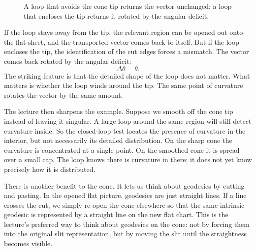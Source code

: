 \begin{figure}[h]
\centering
{}
\caption{A loop that avoids the cone tip returns the vector unchanged; a loop that encloses the tip returns it rotated by the angular deficit.}
\end{figure}

If the loop stays away from the tip, the relevant region can be opened out onto the flat sheet, and the transported vector comes back to itself. But if the loop encloses the tip, the identification of the cut edges forces a mismatch. The vector comes back rotated by the angular deficit:
\begin{equation}
\Delta\theta=\theta.
\end{equation}
The striking feature is that the detailed shape of the loop does not matter. What matters is whether the loop winds around the tip. The same point of curvature rotates the vector by the same amount.

The lecture then sharpens the example. Suppose we smooth off the cone tip instead of leaving it singular. A large loop around the same region will still detect curvature inside. So the closed-loop test locates the presence of curvature in the interior, but not necessarily its detailed distribution. On the sharp cone the curvature is concentrated at a single point. On the smoothed cone it is spread over a small cap. The loop knows there is curvature in there; it does not yet know precisely how it is distributed.

There is another benefit to the cone. It lets us think about geodesics by cutting and pasting. In the opened flat picture, geodesics are just straight lines. If a line crosses the cut, we simply re-open the cone elsewhere so that the same intrinsic geodesic is represented by a straight line on the new flat chart. This is the lecture's preferred way to think about geodesics on the cone: not by forcing them into the original slit representation, but by moving the slit until the straightness becomes visible.

